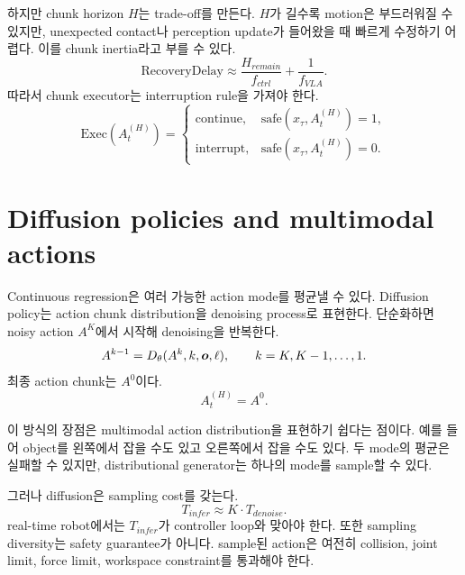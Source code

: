 하지만 chunk horizon $H$는 trade-off를 만든다. $H$가 길수록 motion은 부드러워질 수 있지만, unexpected contact나 perception update가 들어왔을 때 빠르게 수정하기 어렵다. 이를 chunk inertia라고 부를 수 있다.
\begin{equation}
  \mathrm{RecoveryDelay}
  \approx
  \frac{H_{remain}}{f_{ctrl}}
  +
  \frac{1}{f_{VLA}}.
  \label{eq:ch13-recovery-delay}
\end{equation}
따라서 chunk executor는 interruption rule을 가져야 한다.
\begin{equation}
  \mathrm{Exec}(A_t^{(H)})
  =
  \begin{cases}
  \mathrm{continue}, & \mathrm{safe}(x_\tau,A_t^{(H)})=1,\\
  \mathrm{interrupt}, & \mathrm{safe}(x_\tau,A_t^{(H)})=0.
  \end{cases}
  \label{eq:ch13-chunk-interrupt}
\end{equation}

\section{Diffusion policies and multimodal actions}

Continuous regression은 여러 가능한 action mode를 평균낼 수 있다. Diffusion policy는 action chunk distribution을 denoising process로 표현한다. 단순화하면 noisy action $A^K$에서 시작해 denoising을 반복한다.
\begin{equation}
  A^{k-1}
  =
  D_{\theta}(A^k,k,\bm{o},\ell),
  \qquad
  k=K,K-1,\ldots,1.
  \label{eq:ch13-diffusion-denoise}
\end{equation}
최종 action chunk는 $A^0$이다.
\begin{equation}
  A_t^{(H)}
  =
  A^0.
  \label{eq:ch13-diffusion-output}
\end{equation}

이 방식의 장점은 multimodal action distribution을 표현하기 쉽다는 점이다. 예를 들어 object를 왼쪽에서 잡을 수도 있고 오른쪽에서 잡을 수도 있다. 두 mode의 평균은 실패할 수 있지만, distributional generator는 하나의 mode를 sample할 수 있다.

그러나 diffusion은 sampling cost를 갖는다.
\begin{equation}
  T_{infer}
  \approx
  K \cdot T_{denoise}.
  \label{eq:ch13-diffusion-latency}
\end{equation}
real-time robot에서는 $T_{infer}$가 controller loop와 맞아야 한다. 또한 sampling diversity는 safety guarantee가 아니다. sample된 action은 여전히 collision, joint limit, force limit, workspace constraint를 통과해야 한다.

